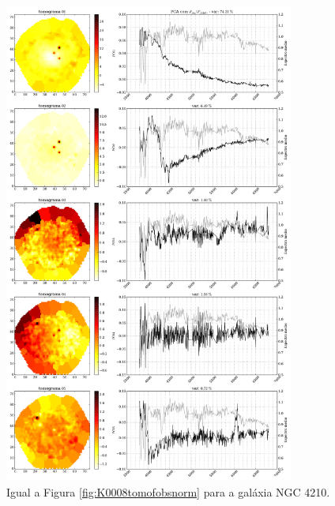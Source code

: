 \begin{figure}
    \includegraphics[width=0.85\textwidth]{figuras/K0518-tomo-obs-norm.pdf}
    \caption[Tomogramas de 1 a 5 para o cubo $F_{obs}$ norm. - NGC 4210.]
    {Igual a Figura \ref{fig:K0008tomofobsnorm} para a galáxia NGC 4210.}
    \label{fig:K0518tomofobsnorm}
\end{figure}

